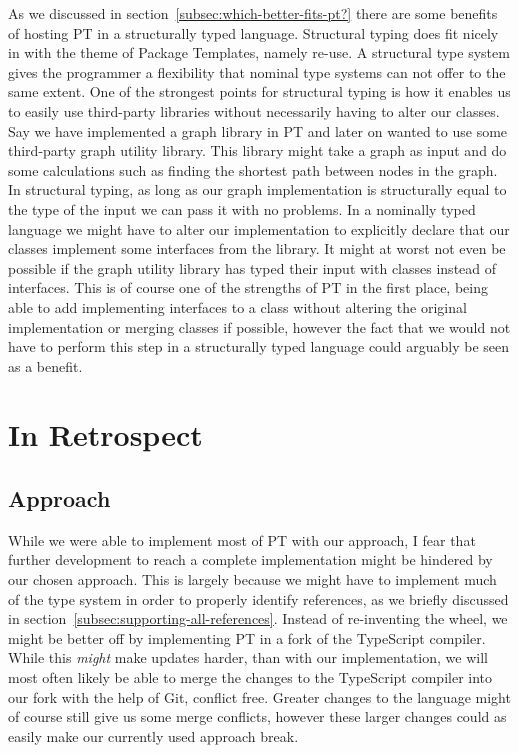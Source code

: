 As we discussed in section~\vref{subsec:which-better-fits-pt?} there are some benefits of hosting PT in a structurally typed language.
Structural typing does fit nicely in with the theme of Package Templates, namely re-use.
A structural type system gives the programmer a flexibility that nominal type systems can not offer to the same extent.
One of the strongest points for structural typing is how it enables us to easily use third-party libraries without necessarily having to alter our classes.
Say we have implemented a graph library in PT and later on wanted to use some third-party graph utility library.
This library might take a graph as input and do some calculations such as finding the shortest path between nodes in the graph.
In structural typing, as long as our graph implementation is structurally equal to the type of the input we can pass it with no problems.
In a nominally typed language we might have to alter our implementation to explicitly declare that our classes implement some interfaces from the library.
It might at worst not even be possible if the graph utility library has typed their input with classes instead of interfaces.
This is of course one of the strengths of PT in the first place, being able to add implementing interfaces to a class without altering the original implementation or merging classes if possible, however the fact that we would not have to perform this step in a structurally typed language could arguably be seen as a benefit.


\section{In Retrospect}\label{sec:in-retrospect}

\subsection{Approach}\label{subsec:result-approach}

While we were able to implement most of PT with our approach, I fear that further development to reach a complete implementation might be hindered by our chosen approach.
This is largely because we might have to implement much of the type system in order to properly identify references, as we briefly discussed in section~\vref{subsec:supporting-all-references}.
Instead of re-inventing the wheel, we might be better off by implementing PT in a fork of the TypeScript compiler.
While this \textit{might} make updates harder, than with our implementation, we will most often likely be able to merge the changes to the TypeScript compiler into our fork with the help of Git, conflict free.
Greater changes to the language might of course still give us some merge conflicts, however these larger changes could as easily make our currently used approach break.

